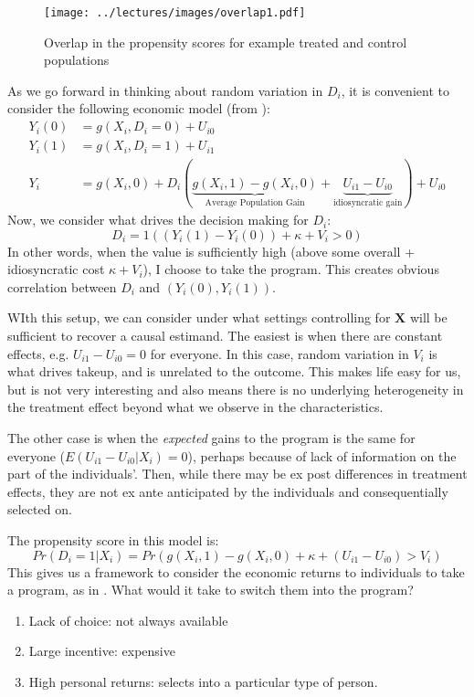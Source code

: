 \documentclass{tufte-handout}
\theoremstyle{break}
\newcommand{\bX}{\mathbf{X}}
\begin{document}
\begin{figure*}
  \label{fig:overlap}
\texttt{[image: ../lectures/images/overlap1.pdf]}
\caption{Overlap in the propensity scores for example treated and control populations}
\end{figure*}        

As we go forward in thinking about random variation in $D_{i}$, it is convenient  to consider  the following economic model (from \citet{heckman1997instrumental}):
\begin{align*}
  Y_{i}(0) &= g(X_{i}, D_{i} = 0) + U_{i0}\\
  Y_{i}(1) &= g(X_{i}, D_{i} = 1) + U_{i1}\\
  Y_{i} &= g(X_{i},0) + D_{i}\left(\underbrace{g(X_{i},1) - g(X_{i},0)}_{\text{Average Population Gain}} + \underbrace{U_{i1} - U_{i0}}_{\text{idiosyncratic gain}}\right) + U_{i0}
\end{align*}
Now, we consider what drives the decision making for $D_{i}$:
\begin{equation*}
  D_{i} = 1( (Y_{i}(1) - Y_{i}(0))   + \kappa + V_{i}  > 0)
\end{equation*}
In other words, when the value is sufficiently high (above some overall + idiosyncratic cost $\kappa+V_{i}$), I choose to take the program. This creates obvious correlation between $D_{i}$ and $(Y_{i}(0), Y_{i}(1))$. 

WIth this setup, we can consider under what settings controlling for $\bX$ will be sufficient to recover a causal estimand. The easiest is when there are constant effects, e.g.  $U_{i1} - U_{i0} = 0$ for everyone. In this case, random variation in $V_{i}$ is what drives takeup, and is unrelated to the outcome. This makes life easy for us, but is not very interesting and also means there is no underlying heterogeneity in the treatment effect beyond what we observe in the characteristics. 

The other case is when the \emph{expected} gains to the program is the same for everyone ($E(U_{i1} - U_{i0}| X_{i}) = 0$), perhaps because of lack of information on the part of the individuals'. Then, while there may be ex post differences in treatment effects, they are not ex ante anticipated by the individuals and consequentially selected on.

The propensity score in this model is:
\begin{equation*}
  Pr(D_{i} = 1 | X_{i}) = Pr\left(g(X_{i},1) - g(X_{i},0) + \kappa + (U_{i1} - U_{i0}) > V_{i} \right) 
\end{equation*}
This gives us a framework to consider the economic returns to individuals to take a program, as in . What would it take to switch them into the program? 
\begin{enumerate}
\item Lack of choice: not always available
\item Large incentive: expensive
\item High personal returns: selects into a particular type of person.
\end{enumerate}
\end{document}
